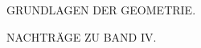 \thispagestyle{empty}
\vspace*{2cm}
\begin{center}
{\Large GRUNDLAGEN DER GEOMETRIE.\par}
\vspace{1cm}
NACHTRÄGE ZU BAND IV.
\end{center}
\clearpage
